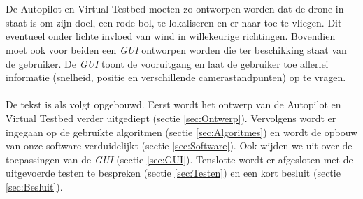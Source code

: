 \\
\\
De Autopilot en Virtual Testbed moeten zo ontworpen worden dat de drone in staat is om zijn doel, een rode bol, te lokaliseren en er naar toe te vliegen. Dit eventueel onder lichte invloed van wind in willekeurige richtingen. Bovendien moet ook voor beiden een \textit{GUI} ontworpen worden die ter beschikking staat van de gebruiker. De \textit{GUI} toont de vooruitgang en laat de gebruiker toe allerlei informatie (snelheid, positie en verschillende camerastandpunten) op te vragen.
\\
\\
De tekst is als volgt opgebouwd. Eerst wordt het ontwerp van de Autopilot en Virtual Testbed verder uitgediept (sectie \ref{sec:Ontwerp}). Vervolgens wordt er ingegaan op de gebruikte algoritmen (sectie \ref{sec:Algoritmes}) en wordt de opbouw van onze software verduidelijkt (sectie \ref{sec:Software}). Ook wijden we uit over de toepassingen van de \textit{GUI} (sectie \ref{sec:GUI}). Tenslotte wordt er afgesloten met de uitgevoerde testen te bespreken (sectie \ref{sec:Testen}) en een kort besluit (sectie \ref{sec:Besluit}). \\